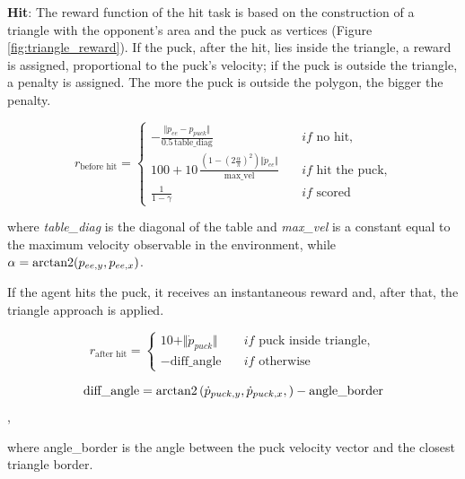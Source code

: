 \textbf{Hit}:
The reward function of the hit task is based on the construction of a triangle with the opponent's area and the puck as vertices (Figure \ref{fig:triangle_reward}).
If the puck, after the hit, lies inside the triangle, a reward is assigned, proportional to the puck's velocity; if the puck is outside the triangle, a penalty is assigned.
The more the puck is outside the polygon, the bigger the penalty.

\begin{equation*}
    r_{\text{before hit}} = \left\{
        \begin{aligned}
            -\frac{\Vert p_{ee} - p_{puck} \Vert}{0.5 \, \text{table\_diag}} \quad &if \text{ no hit,} \\
            100 + 10\,\frac{\left(1 - \left(2\frac{\alpha}{\pi}\right)^2\right)\Vert \dot{p}_{ee} \Vert}{\text{max\_vel}} \quad &if \text{ hit the puck,} \\
            \frac{1}{1 - \gamma} \quad &if \text{ scored}
        \end{aligned}
    \right.
\end{equation*}

where \textit{table\_diag} is the diagonal of the table and \textit{max\_vel} is a constant equal to the maximum velocity observable in the environment,
while $\alpha = \operatorname{arctan2}(p_{ee,y}, p_{ee,x})$.

If the agent hits the puck, it receives an instantaneous reward and, after that, the triangle approach is applied.

\begin{equation*}
    r_{\text{after hit}} = \left\{
        \begin{aligned}
            10 + \Vert \dot{p}_{puck} \Vert \quad  &if \text{ puck inside triangle}, \\
            -\text{diff\_angle} \quad              &if \text{ otherwise} 
        \end{aligned}
    \right.
    \end{equation*}


\begin{equation*}
    \text{diff\_angle} = \operatorname{arctan2}\left(\dot{p}_{puck,y},\dot{p}_{puck,x}, \right) - \text{angle\_border}
\end{equation*},

where angle\_border is the angle between the puck velocity vector and the closest triangle border.

